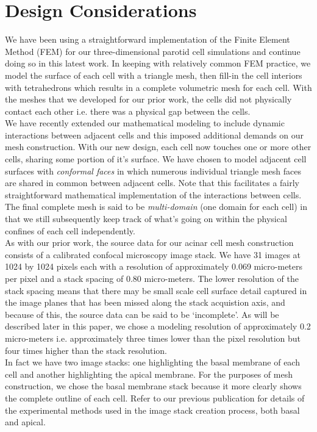 \documentclass[a4paper,10pt]{article}
\begin{document}
\section{Design Considerations} \label{DesignConsiderations}
We have been using a straightforward implementation of the Finite Element Method (FEM) \cite{gockenbach2006understanding,Hughes2000,gosz2005finite} for our three-dimensional parotid cell simulations and continue doing so in this latest work. In keeping with relatively common FEM practice, we model the surface of each cell with a triangle mesh, then fill-in the cell interiors with tetrahedrons which results in a complete volumetric mesh for each cell. With the meshes that we developed for our prior work, the cells did not physically contact each other i.e. there was a physical gap between the cells.\\

We have recently extended our mathematical modeling to include dynamic interactions between adjacent cells and this imposed additional demands on our mesh construction. With our new design, each cell now touches one or more other cells, sharing some portion of it's surface. We have chosen to model adjacent cell surfaces with \emph{conformal faces} in which numerous individual triangle mesh faces are shared in common between adjacent cells. Note that this facilitates a fairly straightforward mathematical implementation of the interactions between cells. The final complete mesh is said to be \emph{multi-domain} (one domain for each cell) in that we still subsequently keep track of what's going on within the physical confines of each cell independently.\\

As with our prior work, the source data for our acinar cell mesh construction consists of a calibrated confocal microscopy image stack. We have 31 images at 1024 by 1024 pixels each with a resolution of approximately 0.069 micro-meters per pixel and a stack spacing of 0.80 micro-meters. The lower resolution of the stack spacing means that there may be small scale cell surface detail captured in the image planes that has been missed along the stack acquistion axis, and because of this, the source data can be said to be `incomplete'.  As will be described later in this paper, we chose a modeling resolution of approximately 0.2 micro-meters i.e. approximately three times lower than the pixel resolution but four times higher than the stack resolution.\\

In fact we have two image stacks: one highlighting the basal membrane of each cell and another highlighting the apical membrane. For the purposes of mesh construction, we chose the basal membrane stack because it more clearly shows the complete outline of each cell.
Refer to our previous publication \cite{Sneyd2017383} for details of the experimental methods used in the image stack creation process, both basal and apical.\\ 
\end{document}

